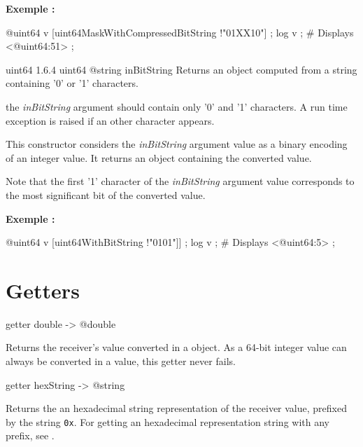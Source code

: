 \textbf{Exemple :}
\begin{galgascode}
@uint64 v [uint64MaskWithCompressedBitString !"01XX10"] ;
log v ; \# Displays <@uint64:51> ;
\end{galgascode}



{uint64}
{1.6.4}
{uint64}
{@string inBitString}
{Returns an  object computed from a string containing '0' or '1' characters.}
{the \emph{inBitString} argument should contain only '0' and '1' characters. A run time exception is raised if an other character appears.

This constructor considers the \emph{inBitString} argument value as a binary encoding of an integer value. It returns an  object containing the converted value.

Note that the first '1' character of the \emph{inBitString} argument value corresponds to the most significant bit of the converted value.}

\textbf{Exemple :}
\begin{galgascode}
@uint64 v [uint64WithBitString !"0101"]] ;
log v ; # Displays <@uint64:5> ;
\end{galgascode}


\section{Getters}


\begin{galgascode}
getter double -> @double
\end{galgascode}

Returns the receiver's value converted in a  object. As a 64-bit integer value can always be converted in a  value, this getter never fails.





\begin{galgascode}
getter hexString -> @string
\end{galgascode}

Returns the an hexadecimal string representation of the receiver value, prefixed by the string \texttt{0x}. For getting an hexadecimal representation string with any prefix, see .





